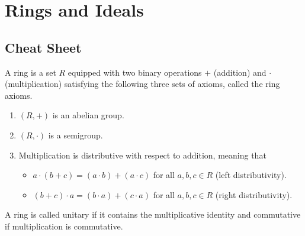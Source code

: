\chapter{Rings and Ideals}

\section{Cheat Sheet}

\begin{defn}[Ring]
    A ring is a set \(R\) equipped with two binary operations \(+\) (addition) and \(\cdot\) (multiplication) satisfying the following three sets of axioms, called the ring axioms.
    \begin{enumerate}
      \item \((R, +)\) is an abelian group.
      \item \((R, \cdot)\) is a semigroup.
      \item Multiplication is distributive with respect to addition, meaning that
      \begin{itemize}
        \item \(a \cdot (b + c) = (a \cdot b) + (a \cdot c)\) for all \(a, b, c \in R\) (left distributivity).
        \item \((b + c) \cdot a = (b \cdot a) + (c \cdot a)\) for all \(a, b, c \in R\) (right distributivity).
      \end{itemize}
    \end{enumerate}
    A ring is called unitary if it contains the multiplicative identity and commutative if multiplication is commutative.
\end{defn}

\begin{defn}[Unit]
    
\end{defn}

\begin{defn}[Zerodivisors]
    
\end{defn}

\begin{defn}[Nilpotent]
    
\end{defn}

\begin{defn}[Idempotent]
    
\end{defn}

\begin{defn}[Ideal]
    
\end{defn}

